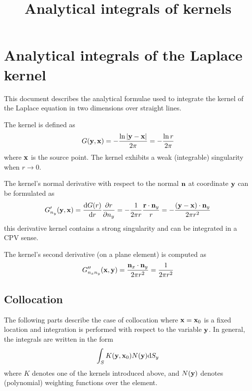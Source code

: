 \documentclass[a4paper,11pt]{article}
\title {Analytical integrals of kernels}
\newcommand{\td}{\mathrm{d}}
\begin{document}
\maketitle

\tableofcontents

\section{Analytical integrals of the Laplace kernel}

This document describes the analytical formulae used to integrate the kernel of the Laplace equation in two dimensions over straight lines.

The kernel is defined as
%
\begin{equation}
G({\bf y}, {\bf x}) = -\frac{\ln |{\bf y}-{\bf x}|}{2\pi} = -\frac{\ln r}{2\pi}
\end{equation}
%
where ${\bf x}$ is the source point. The kernel exhibits a weak (integrable) singularity when $r \to 0$.

The kernel's normal derivative with respect to the normal  ${\bf n}$ at coordinate ${\bf y}$ can be formulated as
%
\begin{equation}
G'_{n_y}({\bf y}, {\bf x}) = \frac{\td G(r)}{\td r} \frac{\partial r}{\partial n_y} = -\frac{1}{2\pi r} \frac{{\bf r} \cdot {\bf n}_y}{r} = -\frac{({\bf y}-{\bf x}) \cdot {\bf n}_y}{2\pi r^2}
\end{equation}
%
this derivative kernel contains a strong singularity and can be integrated in a CPV sense.

The kernel's second derivative (on a plane element) is computed as
%
\begin{equation}
G''_{n_x n_y}({\bf x}, {\bf y}) = \frac{{\bf n}_x \cdot {\bf n}_y}{2\pi r^2} = \frac{1}{2\pi r^2}
\end{equation}


\subsection{Collocation}

The following parts describe the case of collocation where ${\bf x}={\bf x}_0$ is a fixed location and integration is performed with respect to the variable ${\bf y}$. In general, the integrals are written in the form
%
\begin{equation}
\int_S K({\bf y}, {\bf x}_0) N({\bf y}) \td S_y
\end{equation}
%
where $K$ denotes one of the kernels introduced above, and $N({\bf y})$ denotes (polynomial) weighting functions over the element.
\end{document}
